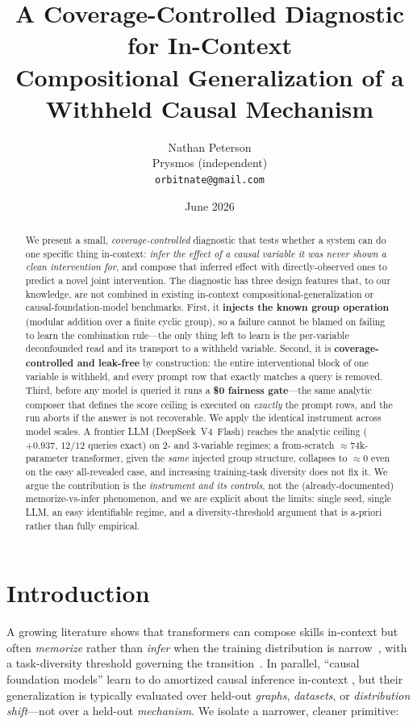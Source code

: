\documentclass[11pt]{article}
\title{\textbf{A Coverage-Controlled Diagnostic for In-Context\\
Compositional Generalization of a Withheld Causal Mechanism}}
\author{Nathan Peterson\\
\small Prysmos (independent)\\
\small\texttt{orbitnate@gmail.com}}
\date{June 2026}
\begin{document}
\maketitle

\begin{abstract}
We present a small, \emph{coverage-controlled} diagnostic that tests whether a system can do one specific
thing in-context: \emph{infer the effect of a causal variable it was never shown a clean intervention
for}, and compose that inferred effect with directly-observed ones to predict a novel joint intervention.
The diagnostic has three design features that, to our knowledge, are not combined in existing in-context
compositional-generalization or causal-foundation-model benchmarks. First, it \textbf{injects the known
group operation} (modular addition over a finite cyclic group), so a failure cannot be blamed on failing
to learn the combination rule---the only thing left to learn is the per-variable deconfounded read and its
transport to a withheld variable. Second, it is \textbf{coverage-controlled and leak-free} by construction:
the entire interventional block of one variable is withheld, and every prompt row that exactly matches a
query is removed. Third, before any model is queried it runs a \textbf{\$0 fairness gate}---the same
analytic composer that defines the score ceiling is executed on \emph{exactly} the prompt rows, and the run
aborts if the answer is not recoverable. We apply the identical instrument across model scales. A frontier
LLM (DeepSeek~V4~Flash) reaches the analytic ceiling ($+0.937$, $12/12$ queries exact) on $2$- and
$3$-variable regimes; a from-scratch $\approx$$74$k-parameter transformer, given the \emph{same} injected
group structure, collapses to $\approx 0$ even on the easy all-revealed case, and increasing training-task
diversity does not fix it. We argue the contribution is the \emph{instrument and its controls}, not the
(already-documented) memorize-vs-infer phenomenon, and we are explicit about the limits: single seed,
single LLM, an easy identifiable regime, and a diversity-threshold argument that is a-priori rather than
fully empirical.
\end{abstract}

\section{Introduction}
A growing literature shows that transformers can compose skills in-context but often \emph{memorize}
rather than \emph{infer} when the training distribution is narrow~\cite{he2024grok,kobayashi2024when},
with a task-diversity threshold governing the transition~\cite{raventos2023pretraining,nguyen2024kinetics}.
In parallel, ``causal foundation models'' learn to do amortized causal inference in-context
\cite{ke2023csiva,sauter2025activa,mahajan2025condfip,robertson2025dopfn}, but their generalization is
typically evaluated over held-out \emph{graphs}, \emph{datasets}, or \emph{distribution shift}---not over a
held-out \emph{mechanism}. We isolate a narrower, cleaner primitive:
\end{document}
